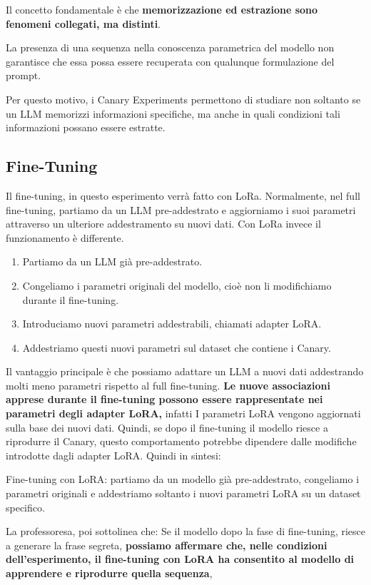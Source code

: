 \begin{observation}
    Il concetto fondamentale è che
    \textbf{memorizzazione ed estrazione
    sono fenomeni collegati, ma distinti}.

    La presenza di una sequenza nella
    conoscenza parametrica del modello
    non garantisce che essa possa essere
    recuperata con qualunque formulazione
    del prompt.

    Per questo motivo, i Canary Experiments
    permettono di studiare non soltanto
    se un LLM memorizzi informazioni
    specifiche, ma anche in quali condizioni
    tali informazioni possano essere estratte.
\end{observation}

\subsection{Fine-Tuning}
Il fine-tuning, in questo esperimento verrà fatto con LoRa.
Normalmente, nel full fine-tuning, partiamo da un LLM pre-addestrato e aggiorniamo i suoi parametri attraverso un ulteriore addestramento su nuovi dati.
Con LoRa invece il funzionamento è differente.
\begin{enumerate}
    \item Partiamo da un LLM già pre-addestrato.
    \item Congeliamo i parametri originali del modello, cioè non li modifichiamo durante il fine-tuning.
    \item Introduciamo nuovi parametri addestrabili, chiamati adapter LoRA.
    \item Addestriamo questi nuovi parametri sul dataset che contiene i Canary.
\end{enumerate}
Il vantaggio principale è che possiamo adattare un LLM a nuovi dati addestrando molti meno parametri rispetto al full fine-tuning.
\textbf{Le nuove associazioni apprese durante il fine-tuning possono essere rappresentate nei parametri degli adapter LoRA,} infatti I parametri LoRA vengono aggiornati sulla base dei nuovi dati.
Quindi, se dopo il fine-tuning il modello riesce a riprodurre il Canary, questo comportamento potrebbe dipendere dalle modifiche introdotte dagli adapter LoRA.
Quindi in sintesi:
\begin{center}
    Fine-tuning con LoRA: partiamo da un modello già pre-addestrato, congeliamo i parametri originali e addestriamo soltanto i nuovi parametri LoRA su un dataset specifico.
\end{center}
La professoresa, poi sottolinea che:
Se il modello dopo la fase di fine-tuning, riesce a generare la frase segreta, \textbf{possiamo affermare che, nelle condizioni dell'esperimento, il fine-tuning con LoRA ha consentito al modello di apprendere e riprodurre quella sequenza},


